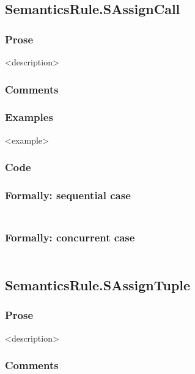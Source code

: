 \documentclass{book}
\begin{document}
\subsection{SemanticsRule.SAssignCall \label{sec:SemanticsRule.SAssignCall}}

    \subsubsection{Prose}
    <description>

    \subsubsection{Comments}

    \subsubsection{Examples}
    <example>

  \subsubsection{Code}

  \subsubsection{Formally: sequential case}
  \begin{align}
  \end{align} 

  \subsubsection{Formally: concurrent case}
  \begin{align}
  \end{align} 

\subsection{SemanticsRule.SAssignTuple \label{sec:SemanticsRule.SAssignTuple}}

    \subsubsection{Prose}
    <description>

    \subsubsection{Comments}
\end{document}
